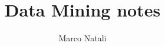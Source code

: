 \documentclass[a4paper, openany]{book}
\theoremstyle{definition}%
\begin{document}
    \title{Data Mining notes}
    \author{Marco Natali}
    \date{}
    \maketitle

    \tableofcontents
    \listoffigures

    
    
\end{document}
